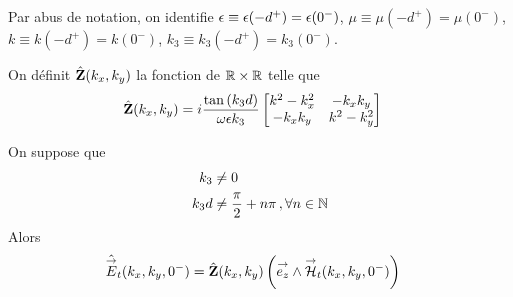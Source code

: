 
        \begin{figure}[!h]
            \begin{center}
                \begin{tikzpicture}
                    
                \end{tikzpicture}
            \end{center}
        \end{figure}

        Par abus de notation, on identifie  \(\eps\equiv \eps(-d^+)=\eps(0^-)\), \(\mu\equiv\mu(-d^+)=\mu(0^-)\), \(k\equiv k(-d^+)=k(0^-)\), \(k_3 \equiv k_3(-d^+) = k_3(0^-)\).

        \begin{defn}
          \label{def:plan:impedance:1c}
          On définit \(\hat \mZ(k_x,k_y)\) la fonction de \(\RR \times \RR\) telle que
          \begin{align*}
            \hat \mZ(k_x,k_y) &= i\frac{\tan\left(k_3d\right)}{\w\eps k_3}
            \begin{bmatrix}
               k^2-k_x^2  & -k_xk_y\\
                -k_xk_y & k^2-k_y^2\\
            \end{bmatrix}
          \end{align*}
        \end{defn}

        \begin{prop}
            \label{prop:imp_plan:symb_z:1c}
            On suppose que
            \begin{align*}
                k_3     & \not = 0 \\
                k_3d    & \not = \frac{\pi}{2}+n\pi\,, \forall n \in \NN
            \end{align*}
            Alors
            \begin{align*}
              \hat \vE_t(k_x,k_y,0^-) &= \hat \mZ(k_x,k_y) \left(\vect{e_z} \pvect \vH_t(k_x,k_y,0^-)\right)
            \end{align*}
        \end{prop}

